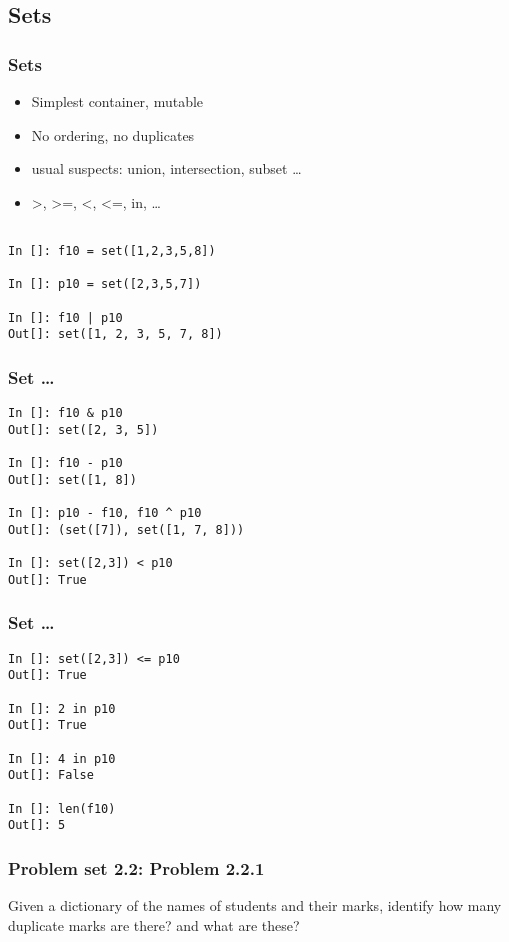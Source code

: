 \documentclass[14pt,compress]{beamer}
\begin{document}
\subsection{Sets}
\begin{frame}[fragile]
  \frametitle{Sets}
    \begin{itemize}
      \item Simplest container, mutable
      \item No ordering, no duplicates
      \item usual suspects: union, intersection, subset \ldots
      \item >, >=, <, <=, in, \ldots
    \end{itemize}
    \begin{lstlisting}

In []: f10 = set([1,2,3,5,8])

In []: p10 = set([2,3,5,7])

In []: f10 | p10
Out[]: set([1, 2, 3, 5, 7, 8])
\end{lstlisting}
\end{frame}

\begin{frame}[fragile]
  \frametitle{Set \ldots}
    \begin{lstlisting}
In []: f10 & p10
Out[]: set([2, 3, 5])

In []: f10 - p10
Out[]: set([1, 8])

In []: p10 - f10, f10 ^ p10
Out[]: (set([7]), set([1, 7, 8]))

In []: set([2,3]) < p10
Out[]: True
\end{lstlisting}
\end{frame}

\begin{frame}[fragile]
  \frametitle{Set \ldots}
    \begin{lstlisting}
In []: set([2,3]) <= p10
Out[]: True

In []: 2 in p10
Out[]: True

In []: 4 in p10
Out[]: False

In []: len(f10)
Out[]: 5
\end{lstlisting}
\end{frame}

\begin{frame}
  \frametitle{Problem set 2.2: Problem 2.2.1}
Given a dictionary of the names of students and their marks, identify how many duplicate marks are there? and what are these?
\end{frame}
\end{document}
